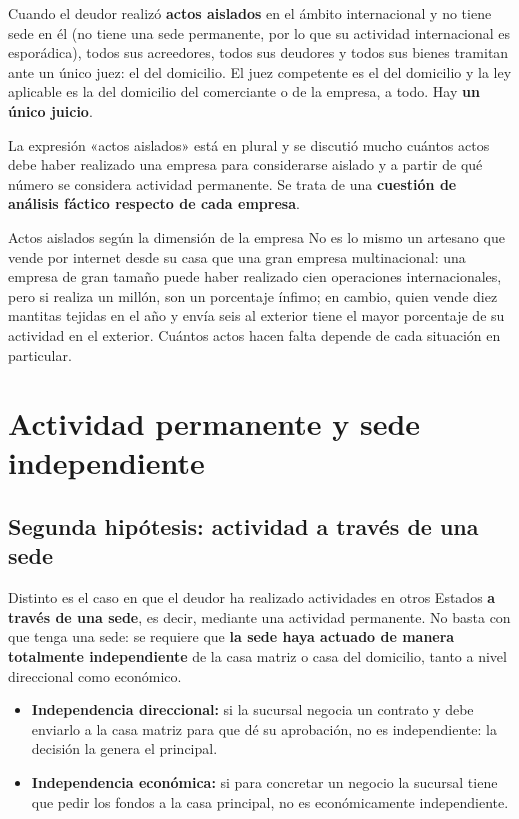 \documentclass[12pt,oneside]{book}
\begin{document}
Cuando el deudor realizó \textbf{actos aislados} en el ámbito internacional y no tiene sede en él (no tiene una sede permanente, por lo que su actividad internacional es esporádica), todos sus acreedores, todos sus deudores y todos sus bienes tramitan ante un único juez: el del domicilio. El juez competente es el del domicilio y la ley aplicable es la del domicilio del comerciante o de la empresa, a todo. Hay \textbf{un único juicio}.

La expresión «actos aislados» está en plural y se discutió mucho cuántos actos debe haber realizado una empresa para considerarse aislado y a partir de qué número se considera actividad permanente. Se trata de una \textbf{cuestión de análisis fáctico respecto de cada empresa}.

\begin{example}{Actos aislados según la dimensión de la empresa}
No es lo mismo un artesano que vende por internet desde su casa que una gran empresa multinacional: una empresa de gran tamaño puede haber realizado cien operaciones internacionales, pero si realiza un millón, son un porcentaje ínfimo; en cambio, quien vende diez mantitas tejidas en el año y envía seis al exterior tiene el mayor porcentaje de su actividad en el exterior. Cuántos actos hacen falta depende de cada situación en particular.
\end{example}

\section{Actividad permanente y sede independiente}

\subsection{Segunda hipótesis: actividad a través de una sede}

Distinto es el caso en que el deudor ha realizado actividades en otros Estados \textbf{a través de una sede}, es decir, mediante una actividad permanente. No basta con que tenga una sede: se requiere que \textbf{la sede haya actuado de manera totalmente independiente} de la casa matriz o casa del domicilio, tanto a nivel direccional como económico.

\begin{itemize}
    \item \textbf{Independencia direccional:} si la sucursal negocia un contrato y debe enviarlo a la casa matriz para que dé su aprobación, no es independiente: la decisión la genera el principal.
    \item \textbf{Independencia económica:} si para concretar un negocio la sucursal tiene que pedir los fondos a la casa principal, no es económicamente independiente.
\end{itemize}
\end{document}
